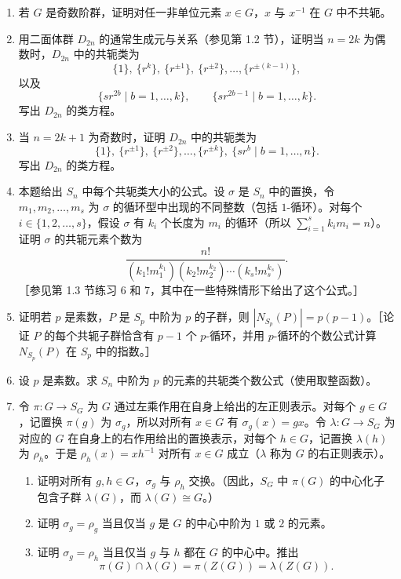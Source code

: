 \begin{enumerate}[label=\arabic*.]
  \item 若 $G$ 是奇数阶群，证明对任一非单位元素 $x\in G$，$x$ 与 $x^{-1}$ 在 $G$ 中不共轭。
  \item 用二面体群 $D_{2n}$ 的通常生成元与关系（参见第 1.2 节），证明当 $n=2k$ 为偶数时，$D_{2n}$ 中的共轭类为
  \[
    \{1\},\ \{r^k\},\ \{r^{\pm1}\},\ \{r^{\pm2}\},\ldots,\{r^{\pm(k-1)}\},
  \]
  以及
  \[
    \{sr^{2b}\mid b=1,\ldots,k\},\qquad
    \{sr^{2b-1}\mid b=1,\ldots,k\}.
  \]
  写出 $D_{2n}$ 的类方程。
  \item 当 $n=2k+1$ 为奇数时，证明 $D_{2n}$ 中的共轭类为
  \[
    \{1\},\ \{r^{\pm1}\},\ \{r^{\pm2}\},\ldots,\{r^{\pm k}\},
    \ \{sr^b\mid b=1,\ldots,n\}.
  \]
  写出 $D_{2n}$ 的类方程。
  \item 本题给出 $S_n$ 中每个共轭类大小的公式。设 $\sigma$ 是 $S_n$ 中的置换，令 $m_1,m_2,\ldots,m_s$ 为 $\sigma$ 的循环型中出现的不同整数（包括 $1$-循环）。对每个 $i\in\{1,2,\ldots,s\}$，假设 $\sigma$ 有 $k_i$ 个长度为 $m_i$ 的循环（所以 $\sum_{i=1}^s k_im_i=n$）。证明 $\sigma$ 的共轭元素个数为
  \[
    \frac{n!}{(k_1!m_1^{k_1})(k_2!m_2^{k_2})\cdots(k_s!m_s^{k_s})}.
  \]
  ［参见第 1.3 节练习 6 和 7，其中在一些特殊情形下给出了这个公式。］
  \item 证明若 $p$ 是素数，$P$ 是 $S_p$ 中阶为 $p$ 的子群，则 $|N_{S_p}(P)|=p(p-1)$。［论证 $P$ 的每个共轭子群恰含有 $p-1$ 个 $p$-循环，并用 $p$-循环的个数公式计算 $N_{S_p}(P)$ 在 $S_p$ 中的指数。］
  \item 设 $p$ 是素数。求 $S_n$ 中阶为 $p$ 的元素的共轭类个数公式（使用取整函数）。
  \item 令 $\pi:G\to S_G$ 为 $G$ 通过左乘作用在自身上给出的左正则表示。对每个 $g\in G$，记置换 $\pi(g)$ 为 $\sigma_g$，所以对所有 $x\in G$ 有 $\sigma_g(x)=gx$。令 $\lambda:G\to S_G$ 为对应的 $G$ 在自身上的右作用给出的置换表示，对每个 $h\in G$，记置换 $\lambda(h)$ 为 $\rho_h$。于是 $\rho_h(x)=xh^{-1}$ 对所有 $x\in G$ 成立（$\lambda$ 称为 $G$ 的右正则表示）。
  \begin{enumerate}[label=(\alph*)]
    \item 证明对所有 $g,h\in G$，$\sigma_g$ 与 $\rho_h$ 交换。（因此，$S_G$ 中 $\pi(G)$ 的中心化子包含子群 $\lambda(G)$，而 $\lambda(G)\cong G$。）
    \item 证明 $\sigma_g=\rho_g$ 当且仅当 $g$ 是 $G$ 的中心中阶为 $1$ 或 $2$ 的元素。
    \item 证明 $\sigma_g=\rho_h$ 当且仅当 $g$ 与 $h$ 都在 $G$ 的中心中。推出
    \[
      \pi(G)\cap\lambda(G)=\pi(Z(G))=\lambda(Z(G)).
    \]
  \end{enumerate}
\end{enumerate}

